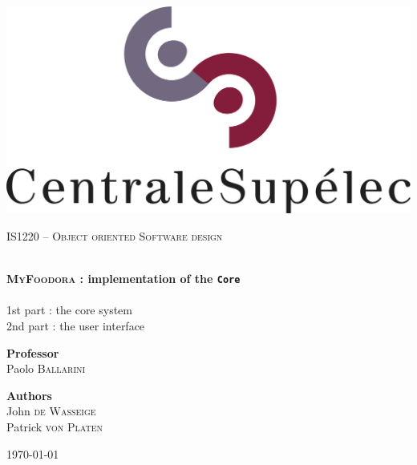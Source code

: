\begin{titlepage}
\begin{center}

\includegraphics[scale=0.5]{./img/logo_centralesup.jpg} \hfill

\vfill 

\textsc{\Large IS1220 -- Object oriented Software design}\\[0.5cm]

\vfill

\HRule \\[0.4cm]
{ \LARGE \bfseries \textsc{MyFoodora} : implementation of the \texttt{Core}\\[0.4cm] }
\HRule \\[1.5cm]

{\Large 
1st part : the core system\\[0.1cm]
2nd part : the user interface\\[0.5cm]
}

\vfill

{\large
\begin{center}
  \textbf{Professor}\\[0.1cm]
  Paolo \textsc{Ballarini}
\end{center}
\vfill
\begin{center}
  \textbf{Authors}\\[0.1cm]
  John \textsc{de Wasseige}\\[0.1cm]
  Patrick \textsc{von Platen}
\end{center}
}

\vfill

{\large \today}

\end{center}
\end{titlepage}